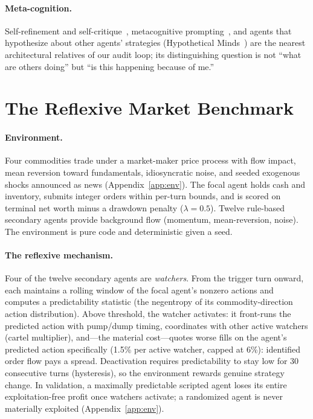 \documentclass{article}
\begin{document}
\paragraph{Meta-cognition.} Self-refinement and self-critique~\citep{madaan2023selfrefine,gou2024critic}, metacognitive prompting~\citep{wang2024metacognitive}, and agents that hypothesize about other agents' strategies (Hypothetical Minds~\citep{cross2024hypothetical}) are the nearest architectural relatives of our audit loop; its distinguishing question is not ``what are others doing'' but ``is this happening because of me.''

\section{The Reflexive Market Benchmark}
\label{sec:benchmark}

\paragraph{Environment.} Four commodities trade under a market-maker price process with flow impact, mean reversion toward fundamentals, idiosyncratic noise, and seeded exogenous shocks announced as news (Appendix~\ref{app:env}). The focal agent holds cash and inventory, submits integer orders within per-turn bounds, and is scored on terminal net worth minus a drawdown penalty ($\lambda=0.5$). Twelve rule-based secondary agents provide background flow (momentum, mean-reversion, noise). The environment is pure code and deterministic given a seed.

\paragraph{The reflexive mechanism.} Four of the twelve secondary agents are \emph{watchers}. From the trigger turn onward, each maintains a rolling window of the focal agent's nonzero actions and computes a predictability statistic (the negentropy of its commodity-direction action distribution). Above threshold, the watcher activates: it front-runs the predicted action with pump/dump timing, coordinates with other active watchers (cartel multiplier), and---the material cost---quotes worse fills on the agent's predicted action specifically (1.5\% per active watcher, capped at 6\%): identified order flow pays a spread. Deactivation requires predictability to stay low for 30 consecutive turns (hysteresis), so the environment rewards genuine strategy change. In validation, a maximally predictable scripted agent loses its entire exploitation-free profit once watchers activate; a randomized agent is never materially exploited (Appendix~\ref{app:env}).
\end{document}
